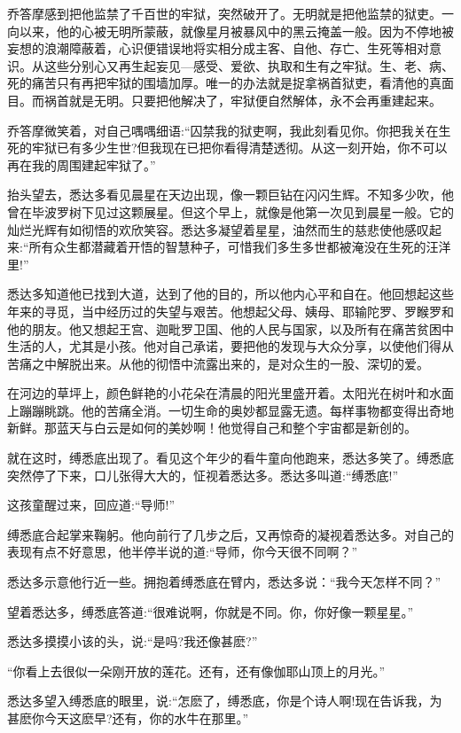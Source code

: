 \documentclass[12pt,twoside,openany]{book}
\begin{document}
乔答摩感到把他监禁了千百世的牢狱，突然破开了。无明就是把他监禁的狱吏。一向以来，他的心被无明所蒙蔽，就像星月被暴风中的黑云掩盖一般。因为不停地被妄想的浪潮障蔽着，心识便错误地将实相分成主客、自他、存亡、生死等相对意识。从这些分别心又再生起妄见—感受、爱欲、执取和生有之牢狱。生、老、病、死的痛苦只有再把牢狱的围墙加厚。唯一的办法就是捉拿祸首狱吏，看清他的真面目。而祸首就是无明。只要把他解决了，牢狱便自然解体，永不会再重建起来。

乔答摩微笑着，对自己喁喁细语:“囚禁我的狱吏啊，我此刻看见你。你把我关在生死的牢狱已有多少生世?但我现在已把你看得清楚透彻。从这一刻开始，你不可以再在我的周围建起牢狱了。”

抬头望去，悉达多看见晨星在天边出现，像一颗巨钻在闪闪生辉。不知多少吹，他曾在毕波罗树下见过这颗展星。但这个早上，就像是他第一次见到晨星一般。它的灿烂光辉有如彻悟的欢欣笑容。悉达多凝望着星星，油然而生的慈悲使他感叹起来:“所有众生都潜藏着开悟的智慧种子，可惜我们多生多世都被淹没在生死的汪洋里!”

悉达多知道他已找到大道，达到了他的目的，所以他内心平和自在。他回想起这些年来的寻觅，当中经历过的失望与艰苦。他想起父母、姨母、耶输陀罗、罗睺罗和他的朋友。他又想起王宫、迦毗罗卫国、他的人民与国家，以及所有在痛苦贫困中生活的人，尤其是小孩。他对自己承诺，要把他的发现与大众分享，以使他们得从苦痛之中解脱出来。从他的彻悟中流露出来的，是对众生的一股、深切的爱。

在河边的草坪上，颜色鲜艳的小花朵在清晨的阳光里盛开着。太阳光在树叶和水面上蹦蹦眺跳。他的苦痛全消。一切生命的奥妙都显露无遗。每样事物都变得出奇地新鲜。那蓝天与白云是如何的美妙啊！他觉得自己和整个宇宙都是新创的。

就在这时，缚悉底出现了。看见这个年少的看牛童向他跑来，悉达多笑了。缚悉底突然停了下来，口儿张得大大的，怔视着悉达多。悉达多叫道:“缚悉底!”

这孩童醒过来，回应道:“导师!”

缚悉底合起掌来鞠躬。他向前行了几步之后，又再惊奇的凝视着悉达多。对自己的表现有点不好意思，他半停半说的道:“导师，你今天很不同啊？”

悉达多示意他行近一些。拥抱着缚悉底在臂内，悉达多说：“我今天怎样不同？”

望着悉达多，缚悉底答道:“很难说啊，你就是不同。你，你好像一颗星星。”

悉达多摸摸小该的头，说:“是吗?我还像甚麽?”

“你看上去很似一朵刚开放的莲花。还有，还有像伽耶山顶上的月光。”

悉达多望入缚悉底的眼里，说:“怎麽了，缚悉底，你是个诗人啊!现在告诉我，为甚麽你今天这麽早?还有，你的水牛在那里。”
\end{document}

